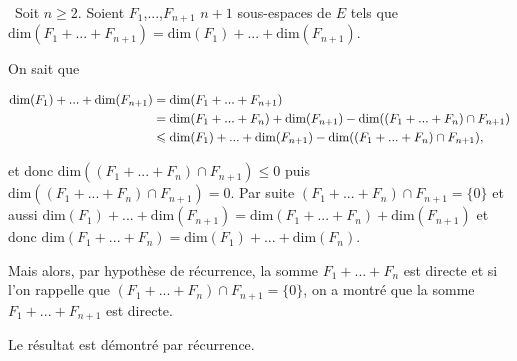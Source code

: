 {{\textbullet~Soit $n\geqslant2$. Soient $F_1$,...,$F_{n+1}$ $n+1$ sous-espaces de $E$ tels que $\text{dim}(F_1+...+F_{n+1})=\text{dim}(F_1)+...+\text{dim}(F_{n+1})$.

On sait que

\begin{align*}\ensuremath
\text{dim}(F_1)+...+\text{dim}(F_{n+1})&=\text{dim}(F_1+...+F_{n+1})\\ 
 &=\text{dim}(F_1+...+F_n) +\text{dim}(F_{n+1})-\text{dim}((F_1+...+F_n)\cap F_{n+1})\\
 &\leqslant\text{dim}(F_1)+...+\text{dim}(F_{n+1})-\text{dim}((F_1+...+F_n)\cap F_{n+1}),
\end{align*}

 
et donc $\text{dim}((F_1+...+F_n)\cap F_{n+1})\leqslant0$ puis $\text{dim}((F_1+...+F_n)\cap F_{n+1})= 0$. Par suite $(F_1+...+F_n)\cap F_{n+1}=\{0\}$ et aussi $\text{dim}(F_1)+...+\text{dim}(F_{n+1})=\text{dim}(F_1+...+F_n) +\text{dim}(F_{n+1})$ et donc $\text{dim}(F_1+...+F_n)=\text{dim}(F_1)+ ... +\text{dim}(F_n)$.

Mais alors, par hypothèse de récurrence, la somme $F_1+...+F_n$ est directe et si l'on rappelle que 
$(F_1+...+F_n)\cap F_{n+1}=\{0\}$, on a montré que la somme $F_1+...+F_{n+1}$ est directe.

Le résultat est démontré par récurrence.
}
}
